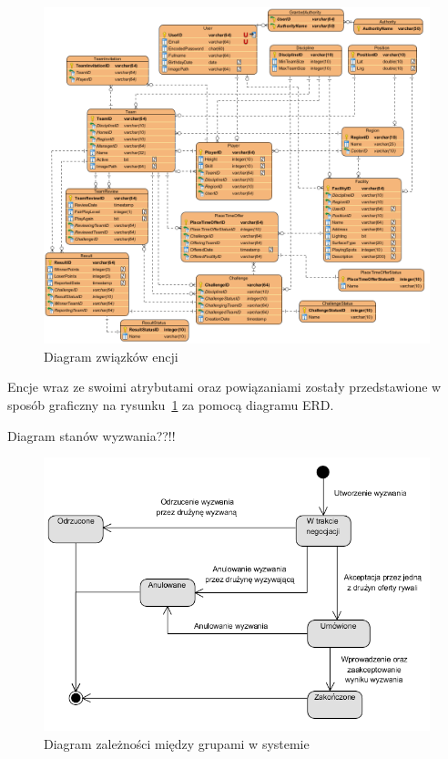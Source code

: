 \begin{figure}[ht]
\centering
\includegraphics[width=1\linewidth]{04-projekt/rys/erd2.PNG}
\caption{Diagram związków encji}
\label{fig:diagram-erd}
\end{figure}

Encje wraz ze swoimi atrybutami oraz powiązaniami zostały przedstawione w sposób graficzny na rysunku~\ref{fig:diagram-erd} za pomocą diagramu ERD.


Diagram stanów wyzwania??!!


\begin{figure}[H]
\centering
\includegraphics[width=\linewidth]{04-projekt/rys/state1.PNG}
\caption{Diagram zależności między grupami w systemie}
\label{fig:diagram-trad-alg-opt}
\end{figure}



